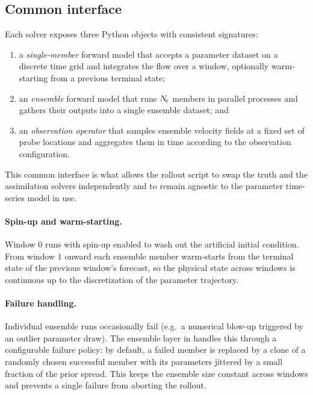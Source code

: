 \subsection{Common interface}
Each solver exposes three Python objects with consistent signatures:
\begin{enumerate}
  \item a \emph{single-member} forward model that accepts a parameter
        dataset on a discrete time grid and integrates the flow over
        a window, optionally warm-starting from a previous terminal
        state;
  \item an \emph{ensemble} forward model that runs $N_{\!e}$ members in
        parallel processes and gathers their outputs into a single
        ensemble dataset; and
  \item an \emph{observation operator} that samples ensemble
        velocity fields at a fixed set of probe locations and
        aggregates them in time according to the observation
        configuration.
\end{enumerate}
This common interface is what allows the rollout script to swap the
truth and the assimilation solvers independently and to remain
agnostic to the parameter time-series model in use.

\paragraph{Spin-up and warm-starting.}
Window $0$ runs with spin-up enabled to wash out the artificial
initial condition.  From window $1$ onward each ensemble member
warm-starts from the terminal state of the previous window's
forecast, so the physical state across windows is continuous up to
the discretization of the parameter trajectory.

\paragraph{Failure handling.}
Individual ensemble runs occasionally fail (e.g.\ a numerical
blow-up triggered by an outlier parameter draw).  The ensemble layer
in \pyurbanair{} handles this through a configurable failure
policy: by default, a failed member is replaced by a clone of a
randomly chosen successful member with its parameters jittered by a
small fraction of the prior spread.  This keeps the ensemble size
constant across windows and prevents a single failure from aborting
the rollout.
